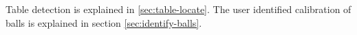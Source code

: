 Table detection is explained in \ref{sec:table-locate}. The user identified calibration of balls is explained in section \ref{sec:identify-balls}.                                                                                                                                                                                                                                                                                                                                                                                                                                                                                                                                                                                                                                                                                                                                                                                                                                                                                                                                                                                                                                                                                                                                                                                                                                                                                                                                                                                                                                                                                                                                                                                                                                                                                                                                                                                                                                                                                                                                                                                                                                                                                                                                                                                                                                                                                                                                                                                                                                                                                                                                                                                                                                                                                                                                                                                                                                                                                                                                                                                                                                                                                                                                                                                                                                                                                                                      